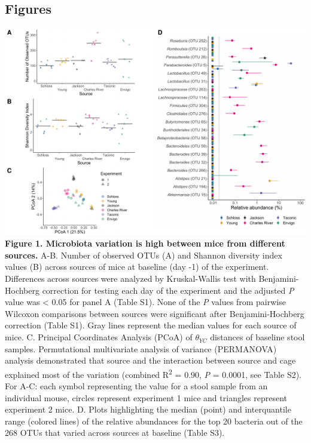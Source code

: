 \documentclass[11pt,]{article}
\begin{document}
\newpage

\subsection{Figures}\label{figures}

\includegraphics{figure_1.pdf} \textbf{Figure 1. Microbiota variation is
high between mice from different sources.} A-B. Number of observed OTUs
(A) and Shannon diversity index values (B) across sources of mice at
baseline (day -1) of the experiment. Differences across sources were
analyzed by Kruskal-Wallis test with Benjamini-Hochberg correction for
testing each day of the experiment and the adjusted \emph{P} value was
\textless{} 0.05 for panel A (Table S1). None of the \emph{P} values
from pairwise Wilcoxon comparisons between sources were significant
after Benjamini-Hochberg correction (Table S1). Gray lines represent the
median values for each source of mice. C. Principal Coordinates Analysis
(PCoA) of \(\theta_{YC}\) distances of baseline stool samples.
Permutational multivariate analysis of variance (PERMANOVA) analysis
demonstrated that source and the interaction between source and cage
explained most of the variation (combined R\textsuperscript{2} = 0.90,
\emph{P} = 0.0001, see Table S2). For A-C: each symbol representing the
value for a stool sample from an individual mouse, circles represent
experiment 1 mice and triangles represent experiment 2 mice. D. Plots
highlighting the median (point) and interquantile range (colored lines)
of the relative abundances for the top 20 bacteria out of the 268 OTUs
that varied across sources at baseline (Table S3).

\newpage
\end{document}
